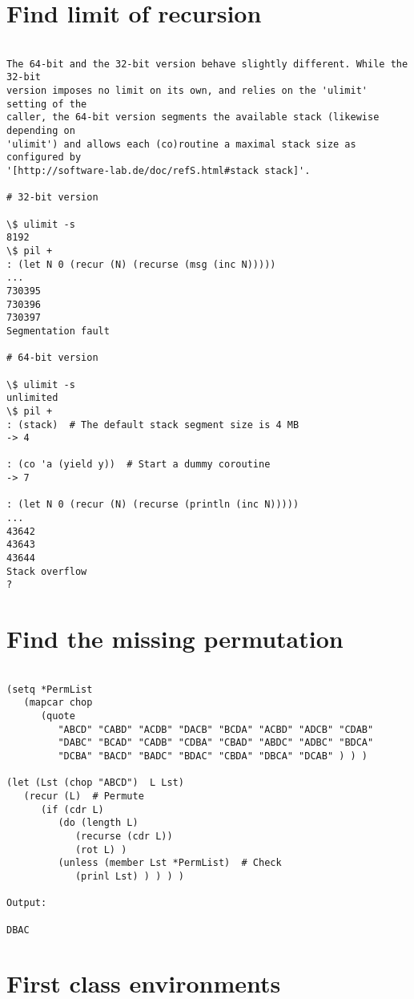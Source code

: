 \section*{Find limit of recursion}

\begin{verbatim}

The 64-bit and the 32-bit version behave slightly different. While the 32-bit
version imposes no limit on its own, and relies on the 'ulimit' setting of the
caller, the 64-bit version segments the available stack (likewise depending on
'ulimit') and allows each (co)routine a maximal stack size as configured by
'[http://software-lab.de/doc/refS.html#stack stack]'.

# 32-bit version

\$ ulimit -s
8192
\$ pil +
: (let N 0 (recur (N) (recurse (msg (inc N)))))
...
730395
730396
730397
Segmentation fault

# 64-bit version

\$ ulimit -s
unlimited
\$ pil +
: (stack)  # The default stack segment size is 4 MB
-> 4

: (co 'a (yield y))  # Start a dummy coroutine
-> 7

: (let N 0 (recur (N) (recurse (println (inc N)))))
...
43642
43643
43644
Stack overflow
?

\end{verbatim}

\section*{Find the missing permutation}

\begin{verbatim}

(setq *PermList
   (mapcar chop
      (quote
         "ABCD" "CABD" "ACDB" "DACB" "BCDA" "ACBD" "ADCB" "CDAB"
         "DABC" "BCAD" "CADB" "CDBA" "CBAD" "ABDC" "ADBC" "BDCA"
         "DCBA" "BACD" "BADC" "BDAC" "CBDA" "DBCA" "DCAB" ) ) )

(let (Lst (chop "ABCD")  L Lst)
   (recur (L)  # Permute
      (if (cdr L)
         (do (length L)
            (recurse (cdr L))
            (rot L) )
         (unless (member Lst *PermList)  # Check
            (prinl Lst) ) ) ) )

Output:

DBAC

\end{verbatim}

\section*{First class environments}

